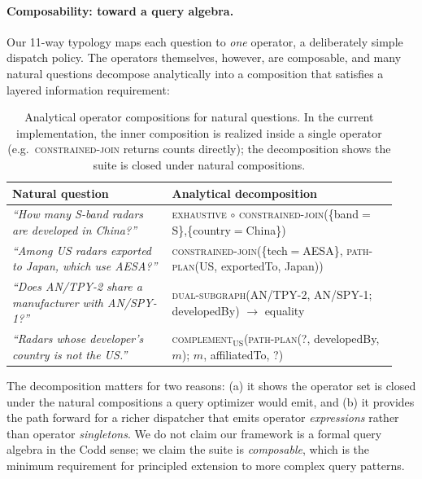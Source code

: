 \documentclass[review]{elsarticle}
\newcommand{\op}[1]{\textsc{\small #1}}
\begin{document}
\paragraph{Composability: toward a query algebra.}
Our 11-way typology maps each question to \emph{one} operator, a deliberately simple dispatch policy. The operators themselves, however, are composable, and many natural questions decompose analytically into a composition that satisfies a layered information requirement:

\begin{table}[h]
\centering
\small
\caption{Analytical operator compositions for natural questions. In the current implementation, the inner composition is realized inside a single operator (e.g.\ \op{constrained-join} returns counts directly); the decomposition shows the suite is closed under natural compositions.}
\label{tab:composability}
\begin{tabular}{p{0.39\linewidth} p{0.55\linewidth}}
\toprule
\textbf{Natural question} & \textbf{Analytical decomposition} \\
\midrule
\emph{``How many S-band radars are developed in China?''} & \op{exhaustive} $\circ$ \op{constrained-join}(\{band$\!=\!$S\},\{country$\!=\!$China\}) \\
\emph{``Among US radars exported to Japan, which use AESA?''} & \op{constrained-join}(\{tech$\!=\!$AESA\}, \op{path-plan}(US, exportedTo, Japan)) \\
\emph{``Does AN/TPY-2 share a manufacturer with AN/SPY-1?''} & \op{dual-subgraph}(AN/TPY-2, AN/SPY-1; developedBy) $\to$ equality \\
\emph{``Radars whose developer's country is not the US.''} & \op{complement}$_{\text{US}}$(\op{path-plan}(?, developedBy, $m$); $m$, affiliatedTo, ?) \\
\bottomrule
\end{tabular}
\end{table}

The decomposition matters for two reasons: (a) it shows the operator set is closed under the natural compositions a query optimizer would emit, and (b) it provides the path forward for a richer dispatcher that emits operator \emph{expressions} rather than operator \emph{singletons}. We do not claim our framework is a formal query algebra in the Codd \citep{codd1970relational} sense; we claim the suite is \emph{composable}, which is the minimum requirement for principled extension to more complex query patterns.
\end{document}
